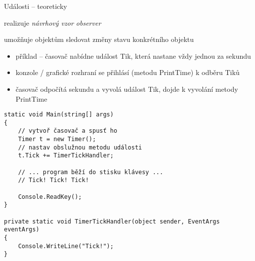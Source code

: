 

\zkouskove


\begin{frame}[fragile]
\begin{bitemize}{Události -- teoreticky}
\item realizuje \textit{návrhový vzor observer}
\item umožňuje objektům sledovat změny stavu konkrétního objektu
\begin{itemize}
\item příklad -- časovač nabídne událost Tik, která nastane vždy jednou za sekundu
\item konzole / grafické rozhraní se přihlásí (metodu PrintTime) k odběru Tiků
\item časovač odpočítá sekundu a vyvolá událost Tik, dojde k vyvolání metody PrintTime
\end{itemize}

\end{bitemize}
\end{frame}



\begin{frame}[fragile]
\begin{yesblock}
\begin{lstlisting}
static void Main(string[] args)
{
	// vytvoř časovač a spusť ho
    Timer t = new Timer();
    // nastav obslužnou metodu události
    t.Tick += TimerTickHandler;

    // ... program běží do stisku klávesy ...
    // Tick! Tick! Tick!

    Console.ReadKey();
}

private static void TimerTickHandler(object sender, EventArgs eventArgs)
{
    Console.WriteLine("Tick!");
}
\end{lstlisting}
\end{yesblock}
\end{frame}



